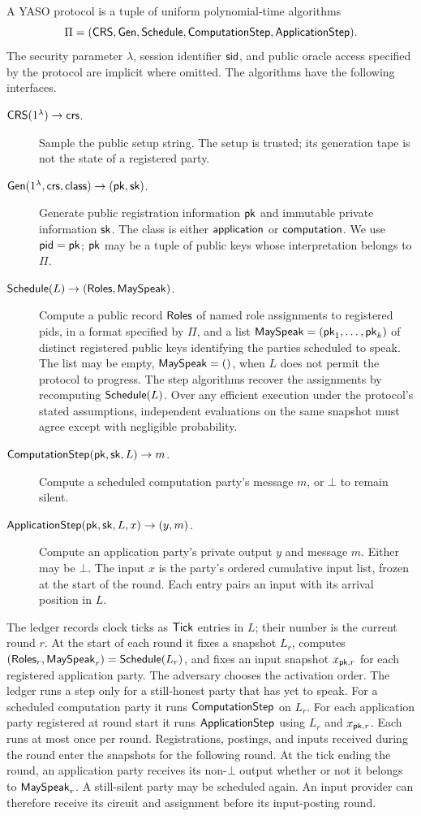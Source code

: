 A YASO protocol is a tuple of uniform polynomial-time algorithms
\[
  \Pi=(\mathsf{CRS},\mathsf{Gen},\mathsf{Schedule},\mathsf{ComputationStep},\mathsf{ApplicationStep}).
\]
The security parameter $\lambda$, session identifier $\mathsf{sid}$, and public
oracle access specified by the protocol are implicit where omitted.
The algorithms have the following interfaces.
\begin{description}
  \item[$\mathsf{CRS}(1^\lambda)\to\mathsf{crs}$.]
    Sample the public setup string.  The setup is trusted; its generation
    tape is not the state of a registered party.
  \item[$\mathsf{Gen}(1^\lambda,\mathsf{crs},\mathsf{class})\to(\mathsf{pk},\mathsf{sk})$.]
    Generate public registration information $\mathsf{pk}$ and immutable
    private information $\mathsf{sk}$.  The class is either $\mathsf{application}$ or
    $\mathsf{computation}$.  We use $\mathsf{pid}=\mathsf{pk}$; $\mathsf{pk}$ may be a tuple of public
    keys whose interpretation belongs to $\Pi$.
  \item[$\mathsf{Schedule}(L)\to(\mathsf{Roles},\mathsf{MaySpeak})$.]
    Compute a public record $\mathsf{Roles}$ of named role
    assignments to registered pids, in a format specified by $\Pi$, and
    a list $\mathsf{MaySpeak}=(\mathsf{pk}_1,\ldots,\mathsf{pk}_k)$ of distinct registered public keys
    identifying the parties scheduled to speak.  The list may be empty,
    $\mathsf{MaySpeak}=()$, when $L$ does not permit the protocol to progress.
    The step algorithms recover the assignments by recomputing
    $\mathsf{Schedule}(L)$.  Over any efficient execution under the protocol's
    stated assumptions, independent evaluations on the same snapshot
    must agree except with negligible probability.
  \item[$\mathsf{ComputationStep}(\mathsf{pk},\mathsf{sk},L)\to m$.]
    Compute a scheduled computation party's message
    $m$, or $\bot$ to remain silent.
  \item[$\mathsf{ApplicationStep}(\mathsf{pk},\mathsf{sk},L,x)\to(y,m)$.]
    Compute an application party's private output $y$ and message $m$.
    Either may be $\bot$.  The input $x$ is the party's ordered
    cumulative input list, frozen at the start of the round.
    Each entry pairs an input with its arrival position in $L$.
\end{description}

The ledger records clock ticks as $\mathsf{Tick}$ entries in $L$; their number
is the current round $r$.  At the start of each round it fixes a snapshot
$L_r$, computes $(\mathsf{Roles}_r,\mathsf{MaySpeak}_r)=\mathsf{Schedule}(L_r)$, and fixes an input
snapshot $x_{\mathsf{pk},r}$ for each registered application party.
The adversary chooses the activation order.  The ledger runs a step only
for a still-honest party that has yet to speak.  For a scheduled computation
party it runs $\mathsf{ComputationStep}$ on $L_r$.  For each application party
registered at round start it runs $\mathsf{ApplicationStep}$ using $L_r$ and
$x_{\mathsf{pk},r}$.  Each runs at most once per round.  Registrations, postings, and inputs received during
the round enter the snapshots for the following round.
At the tick ending the round, an application party receives its
non-$\bot$ output whether or not it belongs to $\mathsf{MaySpeak}_r$.
A still-silent party may be scheduled again.  An input provider can
therefore receive its circuit and assignment before its input-posting
round.

